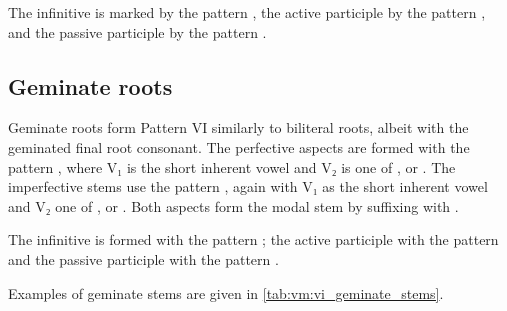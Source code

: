 \documentclass[grammar]{subfiles}
\begin{document}
The infinitive is marked by the pattern , the active participle
by the pattern , and the passive participle by the pattern
.  
 
 
\subsection{Geminate roots}
\label{ssec:vm:vi_geminate_roots}

Geminate roots form Pattern VI similarly to biliteral roots, albeit with the
geminated final root consonant. The perfective aspects are formed with the
pattern , where V₁ is the short inherent vowel and V₂ is one
of ,  or .  The imperfective stems use the pattern
, again with V₁ as the short inherent vowel and V₂ one of
,  or .  Both aspects form the modal stem by suffixing
with . 

The infinitive is formed with the pattern ; the active
participle with the pattern  and the passive participle with the
pattern . 

Examples of geminate stems are given in \cref{tab:vm:vi_geminate_stems}. 

\begin{table}[h!]\small\capstart
  \centering
  \\
  \caption{Pattern VI geminate stems \label{tab:vm:vi_geminate_stems}}
\end{table}
\end{document}
